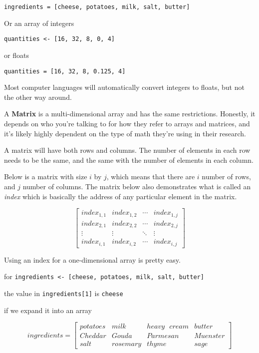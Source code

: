 \documentclass[
]{book}
\begin{document}
\texttt{ingredients\ =\ {[}cheese,\ potatoes,\ milk,\ salt,\ butter{]}}

Or an array of integers

\texttt{quantities\ \textless{}-\ {[}16,\ 32,\ 8,\ 0,\ 4{]}}

or floats

\texttt{quantities\ =\ {[}16,\ 32,\ 8,\ 0.125,\ 4{]}}

Most computer languages will automatically convert integers to floats, but not the other way around.

A \textbf{Matrix} is a multi-dimensional array and has the same restrictions. Honestly, it depends on who you're talking to for how they refer to arrays and matrices, and it's likely highly dependent on the type of math they're using in their research.

A matrix will have both rows and columns. The number of elements in each row needs to be the same, and the same with the number of elements in each column.

Below is a matrix with size \(i\) by \(j\), which means that there are \(i\) number of rows, and \(j\) number of columns. The matrix below also demonstrates what is called an \emph{index} which is basically the address of any particular element in the matrix.

\begin{equation}
\begin{bmatrix}
  index_{1,1} & index_{1,2} & \cdots & index_{1,j} \\
  index_{2,1} & index_{2,2} & \cdots & index_{2,j} \\
  \vdots  & \vdots  & \ddots & \vdots  \\
  index_{i,1} & index_{i,2} & \cdots & index_{i,j} 
\end{bmatrix}
\end{equation}

Using an index for a one-dimensional array is pretty easy.

for \texttt{ingredients\ \textless{}-\ {[}cheese,\ potatoes,\ milk,\ salt,\ butter{]}}

the value in \texttt{ingredients{[}1{]}} is \texttt{cheese}

if we expand it into an array

\begin{equation}
ingredients =
\begin{bmatrix}
  potatoes & milk & heavy\text{ }cream & butter \\
  Cheddar & Gouda & Parmesan &  Muenster \\
  salt & rosemary & thyme & sage
\end{bmatrix}
\end{equation}
\end{document}
